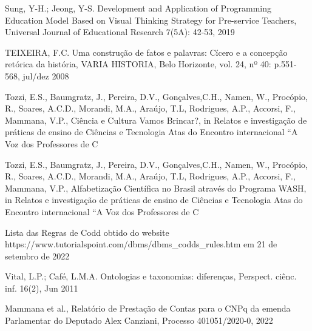 \begin{flushleft}
[SUNG, 2019] Sung, Y-H.; Jeong, Y-S. Development and Application of Programming Education Model Based on Visual Thinking Strategy for Pre-service Teachers, Universal Journal of Educational Research 7(5A): 42-53, 2019
\end{flushleft}


\begin{flushleft}
[TEIXEIRA, 2008] TEIXEIRA, F.C. Uma construção de fatos e palavras: Cícero e a concepção retórica da história, VARIA HISTORIA, Belo Horizonte, vol. 24, nº 40: p.551-568, jul/dez 2008
\end{flushleft}


\begin{flushleft}
[TOZZI, 2021] Tozzi, E.S., Baumgratz, J., Pereira, D.V., Gonçalves,C.H., Namen, W., Procópio, R., Soares, A.C.D., Morandi, M.A., Araújo, T.L, Rodrigues, A.P., Accorsi, F., Mammana, V.P., Ciência e Cultura Vamos Brincar?, in Relatos e investigação de práticas de ensino de Ciências e Tecnologia Atas do Encontro internacional “A Voz dos Professores de C
\end{flushleft}


\begin{flushleft}
[TOZZI, 2021a] Tozzi, E.S., Baumgratz, J., Pereira, D.V., Gonçalves,C.H., Namen, W., Procópio, R., Soares, A.C.D., Morandi, M.A., Araújo, T.L, Rodrigues, A.P., Accorsi, F., Mammana, V.P., Alfabetização Científica no Brasil através do Programa WASH, in Relatos e investigação de práticas de ensino de Ciências e Tecnologia Atas do Encontro internacional “A Voz dos Professores de C
\end{flushleft}


\begin{flushleft}
[TutorialsPoint, 2022] Lista das Regras de Codd obtido do website https://www.tutorialspoint.com/dbms/dbms\_codds\_rules.htm em 21 de setembro de 2022
\end{flushleft}


\begin{flushleft}
 Vital, L.P.; Café, L.M.A. Ontologias e taxonomias: diferenças, Perspect. ciênc. inf. 16(2), Jun 2011
\end{flushleft}


\begin{flushleft}
[WASHCNPq, 2022] Mammana et al., Relatório de Prestação de Contas para o CNPq da emenda Parlamentar do Deputado Alex Canziani, Processo 401051/2020-0, 2022
\end{flushleft}


